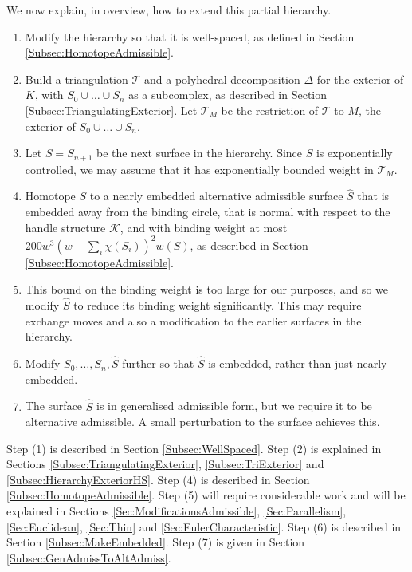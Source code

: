 \documentclass[oneside]{amsart}
\numberwithin{equation}{section}
\theoremstyle{plain}
\theoremstyle{definition}
\begin{document}
We now explain, in overview, how to extend this partial hierarchy.

\begin{enumerate}
\item Modify the hierarchy so that it is well-spaced, as defined in Section \ref{Subsec:HomotopeAdmissible}.
\item Build a triangulation $\mathcal{T}$ and a polyhedral decomposition $\Delta$ for the exterior of $K$,
with $S_0 \cup \dots \cup S_n$ as a subcomplex,
as described in Section \ref{Subsec:TriangulatingExterior}. Let $\mathcal{T}_M$ be the restriction of $\mathcal{T}$
to $M$, the exterior of $S_0 \cup \dots \cup S_n$.
\item Let $S = S_{n+1}$ be the next surface in the hierarchy. Since $S$ is exponentially controlled, we may
assume that it has exponentially bounded weight in $\mathcal{T}_M$.
\item Homotope $S$ to a nearly embedded alternative admissible surface $\hat S$ that is embedded away
from the binding circle, that is normal with respect to 
the handle structure $\mathcal{K}$, 
and with binding weight at most $200 w^3(w - \sum_i \chi(S_i))^2 w(S)$, 
as described in Section \ref{Subsec:HomotopeAdmissible}.
\item This bound on the binding weight is too large for our purposes, and
so we modify $\hat S$ to reduce its binding weight significantly. This may require exchange moves
and also a modification to the earlier surfaces in the hierarchy.
\item Modify $S_0, \dots, S_n, \hat S$ further so that $\hat S$ is embedded, rather than just nearly embedded.
\item The surface $\hat S$ is in generalised admissible form, but we require it to be alternative admissible. A small perturbation to the surface achieves this.
\end{enumerate}

Step (1) is described in Section \ref{Subsec:WellSpaced}. 
Step (2) is explained in Sections \ref{Subsec:TriangulatingExterior}, \ref{Subsec:TriExterior} and \ref{Subsec:HierarchyExteriorHS}.
Step (4) is described in Section \ref{Subsec:HomotopeAdmissible}. 
Step (5) will require considerable work
and will be explained in Sections \ref{Sec:ModificationsAdmissible}, \ref{Sec:Parallelism},  \ref{Sec:Euclidean}, \ref{Sec:Thin}
and \ref{Sec:EulerCharacteristic}. Step (6) is described in Section \ref{Subsec:MakeEmbedded}. Step (7) is given in Section \ref{Subsec:GenAdmissToAltAdmiss}.
\end{document}
